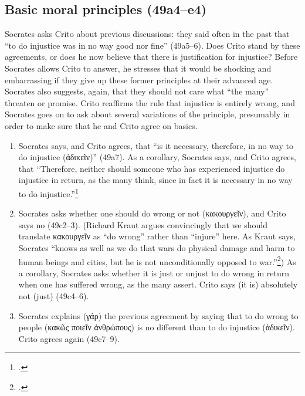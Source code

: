 \documentclass[12pt,letterpaper]{article}
\begin{document}
\subsection*{Basic moral principles (49a4--e4)}

Socrates asks Crito about previous discussions: they said often in the past that ``to do injustice was in no way good nor fine'' (49a5--6). Does Crito stand by these agreements, or does he now believe that there is justification for injustice? Before Socrates allows Crito to answer, he stresses that it would be shocking and embarrassing if they give up these former principles at their advanced age. Socrates also suggests, again, that they should not care what ``the many'' threaten or promise. Crito reaffirms the rule that injustice is entirely wrong, and Socrates goes on to ask about several variations of the principle, presumably in order to make sure that he and Crito agree on basics.

\begin{enumerate}
    \item Socrates says, and Crito agrees, that ``is it necessary, therefore, in no way to do injustice (\textgreek{ἀδικεῖν})'' (49a7). As a corollary, Socrates says, and Crito agrees, that ``Therefore, neither should someone who has experienced injustice do injustice in return, as the many think, since in fact it is necessary in no way to do injustice.''\footcite[I call the second claim a ``corollary'' following][25--26]{kraut-socrates-state-1984}
    \item Socrates asks whether one should do wrong or not (\textgreek{κακουργεῖν}), and Crito says no (49c2--3). (Richard Kraut argues convincingly that we should translate \textgreek{κακουργεῖν} as ``do wrong'' rather than ``injure'' here. As Kraut says, Socrates ``knows as well as we do that wars do physical damage and harm to human beings and cities, but he is not unconditionally opposed to war.''\footcite[][26, note 2]{kraut-socrates-state-1984}) As a corollary, Socrates asks whether it is just or unjust to do wrong in return when one has suffered wrong, as the many assert. Crito says (it is) absolutely not (just) (49c4--6).
    \item Socrates explains (\textgreek{γάρ}) the previous agreement by saying that to do wrong to people (\textgreek{κακῶς ποιεῖν ἀνθρώπους}) is no different than to do injustice (\textgreek{ἀδικεῖν}). Crito agrees again (49c7--9).
\end{enumerate}
\end{document}
